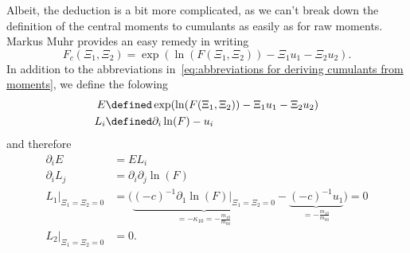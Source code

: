 Albeit, the deduction is a bit more complicated, as we can't break down the definition of the central moments to cumulants as easily as for raw moments.
Markus Muhr provides an easy remedy in writing
\begin{equation}
  F_c(\Xi_1, \Xi_2) = \exp(\ln(F(\Xi_1,\Xi_2)) - \Xi_1 u_1 - \Xi_2 u_2).
\end{equation}
In addition to the abbreviations in~\eqref{eq:abbreviations for deriving cumulants from moments}, we define the folowing
\begin{equation}
  \begin{aligned}
    E & \defined \exp(\ln(F(\Xi_1,\Xi_2)) - \Xi_1 u_1 - \Xi_2 u_2) \\
    L_i & \defined \partial_i \ln(F) - u_i
  \end{aligned}
\end{equation}
and therefore
\begin{equation}
  \begin{aligned}
    \partial_i E & = EL_i \\
    \partial_i L_j & = \partial_i\partial_j\ln(F)\\
    L_1\bigr|_{\Xi_1=\Xi_2 = 0} & = \bigg(
      \underbrace{{(-c)}^{-1} \partial_1\ln(F) \bigr|_{\Xi_1=\Xi_2 = 0}}_{=-\kappa_{10}=-\frac{m_{10}}{m_{00}}}
      - \underbrace{{(-c)}^{-1}u_1}_{=-\frac{m_{10}}{m_{00}}} \bigg) = 0 \\
    L_2\bigr|_{\Xi_1=\Xi_2 = 0} & = 0.
  \end{aligned}
\end{equation}

